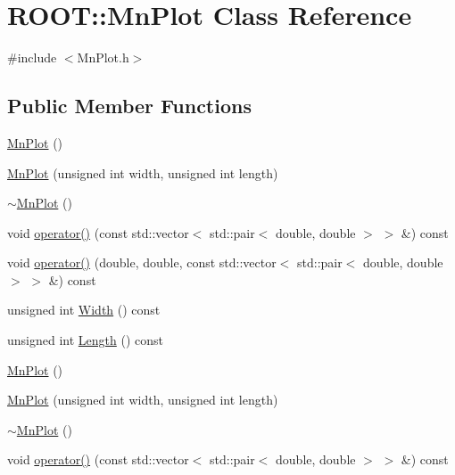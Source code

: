 \hypertarget{classROOT_1_1Minuit2_1_1MnPlot}{}\section{R\+O\+OT\+:\+:Mn\+Plot Class Reference}
\label{classROOT_1_1Minuit2_1_1MnPlot}


{\ttfamily \#include $<$Mn\+Plot.\+h$>$}

\subsection*{Public Member Functions}
\begin{DoxyCompactItemize}
\item 
\mbox{\hyperlink{classROOT_1_1Minuit2_1_1MnPlot_af7943a6243c6f1a96083c875d38f749c}{Mn\+Plot}} ()
\item 
\mbox{\hyperlink{classROOT_1_1Minuit2_1_1MnPlot_ae5a2182c4b4922bd53b7cc1fd8293bea}{Mn\+Plot}} (unsigned int width, unsigned int length)
\item 
\mbox{\hyperlink{classROOT_1_1Minuit2_1_1MnPlot_a959d1e77755e80a3edbdd1e7133f5d83}{$\sim$\+Mn\+Plot}} ()
\item 
void \mbox{\hyperlink{classROOT_1_1Minuit2_1_1MnPlot_a118857899dee9d8222acc5c4926956ca}{operator()}} (const std\+::vector$<$ std\+::pair$<$ double, double $>$ $>$ \&) const
\item 
void \mbox{\hyperlink{classROOT_1_1Minuit2_1_1MnPlot_a6cae4ab8961e9f7933320789d101ec1e}{operator()}} (double, double, const std\+::vector$<$ std\+::pair$<$ double, double $>$ $>$ \&) const
\item 
unsigned int \mbox{\hyperlink{classROOT_1_1Minuit2_1_1MnPlot_ae9d97799fcd00d4aa2095884d99dc588}{Width}} () const
\item 
unsigned int \mbox{\hyperlink{classROOT_1_1Minuit2_1_1MnPlot_aefbe338659ecdac9b7ad160472a34221}{Length}} () const
\item 
\mbox{\hyperlink{classROOT_1_1Minuit2_1_1MnPlot_af7943a6243c6f1a96083c875d38f749c}{Mn\+Plot}} ()
\item 
\mbox{\hyperlink{classROOT_1_1Minuit2_1_1MnPlot_ae5a2182c4b4922bd53b7cc1fd8293bea}{Mn\+Plot}} (unsigned int width, unsigned int length)
\item 
\mbox{\hyperlink{classROOT_1_1Minuit2_1_1MnPlot_a959d1e77755e80a3edbdd1e7133f5d83}{$\sim$\+Mn\+Plot}} ()
\item 
void \mbox{\hyperlink{classROOT_1_1Minuit2_1_1MnPlot_a118857899dee9d8222acc5c4926956ca}{operator()}} (const std\+::vector$<$ std\+::pair$<$ double, double $>$ $>$ \&) const

\end{DoxyCompactItemize}
